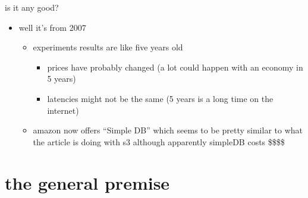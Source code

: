 \documentclass{beamer}
\begin{document}
  \begin{frame}{is it any good?}
    \begin{itemize}
      \item
        well it's from 2007
        \begin{itemize}
        \item
          experiments results are like five years old
          \begin{itemize}
          \item
            prices have probably changed (a lot could happen with an economy in 5 years)
          \item 
            latencies might not be the same (5 years is a long time on the internet)
          \end{itemize}
        \item
          amazon now offers ``Simple DB'' which seems to be pretty similar to what the article is doing with s3 although apparently simpleDB costs \$\$\$\$
        \end{itemize}
      \end{itemize}
    \end{frame}

\section{the general premise}
\end{document}
